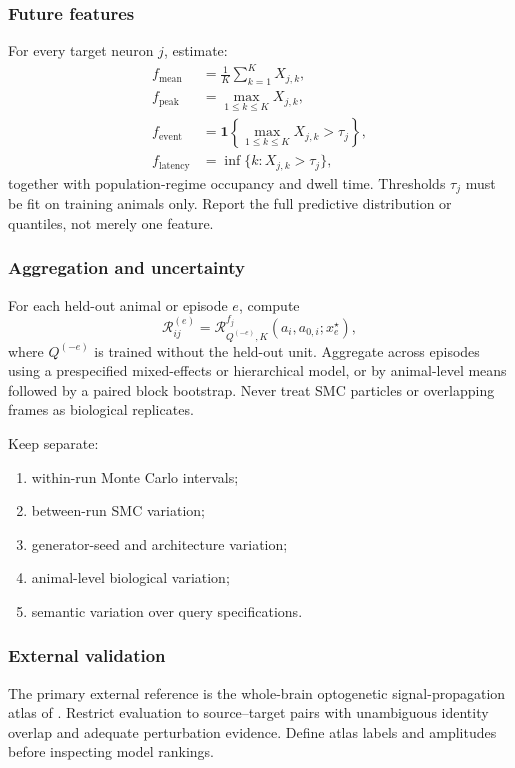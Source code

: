 \documentclass{article}
\theoremstyle{remark}
\begin{document}
\subsubsection{Future features}

For every target neuron \(j\), estimate:
\begin{align*}
  f_{\mathrm{mean}}
  &=
  \frac{1}{K}\sum_{k=1}^K X_{j,k},\\
  f_{\mathrm{peak}}
  &=
  \max_{1\leq k\leq K}X_{j,k},\\
  f_{\mathrm{event}}
  &=
  \mathbf 1\left\{
    \max_{1\leq k\leq K}X_{j,k}>\tau_j
  \right\},\\
  f_{\mathrm{latency}}
  &=
  \inf\{k:X_{j,k}>\tau_j\},
\end{align*}
together with population-regime occupancy and dwell time. Thresholds
\(\tau_j\) must be fit on training animals only. Report the full predictive
distribution or quantiles, not merely one feature.

\subsubsection{Aggregation and uncertainty}

For each held-out animal or episode \(e\), compute
\[
  \mathcal R_{ij}^{(e)}
  =
  \mathcal R_{Q^{(-e)},K}^{f_j}
  (a_i,a_{0,i};x_e^\star),
\]
where \(Q^{(-e)}\) is trained without the held-out unit. Aggregate across
episodes using a prespecified mixed-effects or hierarchical model, or by
animal-level means followed by a paired block bootstrap. Never treat SMC
particles or overlapping frames as biological replicates.

Keep separate:
\begin{enumerate}[leftmargin=1.5em]
  \item within-run Monte Carlo intervals;
  \item between-run SMC variation;
  \item generator-seed and architecture variation;
  \item animal-level biological variation;
  \item semantic variation over query specifications.
\end{enumerate}

\subsubsection{External validation}

The primary external reference is the whole-brain optogenetic
signal-propagation atlas of \citet{randi2023neural}. Restrict evaluation to
source--target pairs with unambiguous identity overlap and adequate
perturbation evidence. Define atlas labels and amplitudes before inspecting
model rankings.
\end{document}

